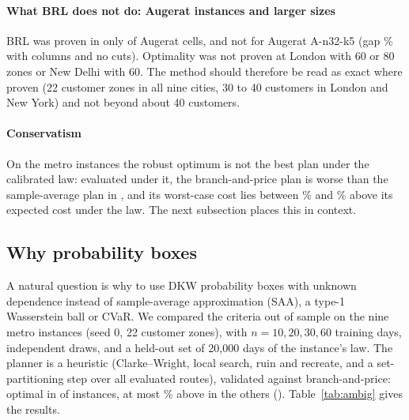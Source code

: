 \documentclass[preprint,12pt]{elsarticle}
\theoremstyle{definition}
\theoremstyle{remark}
\begin{document}
\paragraph{What BRL does not do: Augerat instances and larger sizes} BRL was proven in only \BrlAugeratProvenN{} of \BrlAugeratCells{} Augerat cells, and not for Augerat A-n32-k5 (gap \BrlAugGap\% with \BrlAugCols{} columns and no cuts). Optimality was not proven at London with 60 or 80 zones or New Delhi with 60. The method should therefore be read as exact where proven (22 customer zones in all nine cities, 30 to 40 customers in London and New York) and not beyond about 40 customers.

\paragraph{Conservatism} On the metro instances the robust optimum is not the best plan under the calibrated law: evaluated under it, the branch-and-price plan is worse than the sample-average plan in \BPtrueWorse, and its worst-case cost lies between \BPconsMin\% and \BPconsMax\% above its expected cost under the law. The next subsection places this in context.

\subsection{Why probability boxes}\label{sec:res-pbox}

A natural question is why to use DKW probability boxes with unknown dependence instead of sample-average approximation (SAA), a type-1 Wasserstein ball or CVaR. We compared the criteria out of sample on the nine metro instances (seed 0, 22 customer zones), with $n=10,20,30,60$ training days, \AmbDraws{} independent draws, and a held-out set of 20{,}000 days of the instance's law. The planner is a heuristic (Clarke--Wright, local search, ruin and recreate, and a set-partitioning step over all evaluated routes), validated against branch-and-price: optimal in \AmbValOptN{} of \AmbValRows{} instances, at most \AmbValMaxGap\% above in the others (\AmbValMaxCity). Table~\ref{tab:ambig} gives the results.

\begin{table}[tbp]\centering\small
\caption{Out-of-sample comparison of criteria on the nine metro instances (mean over \AmbDraws{} draws and cities). Regret: expected cost of the plan above the best known plan for the true law, \%. Other columns at $n=20$: probability that at least one route runs overtime on a day; CVaR$_{0.95}$ of the daily plan cost above the best known expected cost; criterion value minus realised expected cost.}\label{tab:ambig}
\end{table}
\end{document}
